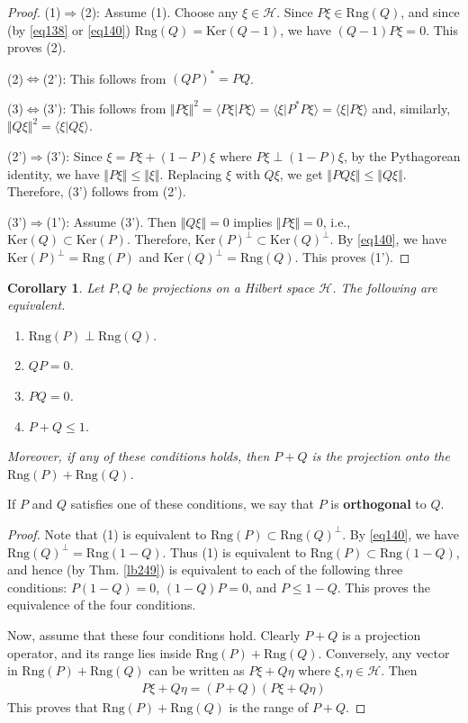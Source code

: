 \documentclass[12pt,b5paper,notitlepage]{article}
\theoremstyle{definition}
\theoremstyle{plain}
\newtheorem{co}[df]{Corollary}
\newcommand{\bk}[1]{\langle {#1}\rangle}
\newcommand{\Ker}{\mathrm{Ker}}
\newcommand{\Rng}{\mathrm{Rng}}
\newcommand{\MH}{\mathcal H}
\numberwithin{equation}{section}
\begin{document}
\begin{proof}
(1)$\Rightarrow$(2): Assume (1). Choose any $\xi\in\MH$. Since $P\xi\in \Rng(Q)$, and since (by \eqref{eq138} or \eqref{eq140}) $\Rng(Q)=\Ker(Q-1)$, we have $(Q-1)P\xi=0$. This proves (2).

(2)$\Leftrightarrow$(2'): This follows from $(QP)^*=PQ$.

(3)$\Leftrightarrow$(3'): This follows from $\Vert P\xi\Vert^2=\bk{P\xi|P\xi}=\bk{\xi|P^*P\xi}=\bk{\xi|P\xi}$ and, similarly, $\Vert Q\xi\Vert^2=\bk{\xi|Q\xi}$.

(2')$\Rightarrow$(3'): Since $\xi=P\xi+(1-P)\xi$ where $P\xi\perp(1-P)\xi$, by the Pythagorean identity, we have $\Vert P\xi\Vert\leq \Vert\xi\Vert$. Replacing $\xi$ with $Q\xi$, we get $\Vert PQ\xi\Vert\leq\Vert Q\xi\Vert$. Therefore, (3') follows from (2'). 


(3')$\Rightarrow$(1'): Assume (3'). Then $\Vert Q\xi\Vert=0$ implies $\Vert P\xi\Vert=0$, i.e.,  $\Ker(Q)\subset\Ker(P)$. Therefore, $\Ker(P)^\perp\subset\Ker(Q)^\perp$. By \eqref{eq140}, we have $\Ker(P)^\perp=\Rng(P)$ and $\Ker(Q)^\perp=\Rng(Q)$. This proves (1').
\end{proof}

\begin{co}\label{lb322}
Let $P,Q$ be projections on a Hilbert space $\MH$. The following are equivalent.
\begin{enumerate}[label=(\arabic*)]
\item $\Rng(P)\perp\Rng(Q)$.
\item $QP=0$.
\item $PQ=0$. 
\item $P+Q\leq 1$.
\end{enumerate}
Moreover, if any of these conditions holds, then $P+Q$ is the projection onto the $\Rng(P)+\Rng(Q)$.
\end{co}

If $P$ and $Q$ satisfies one of these conditions, we say that $P$ is \textbf{orthogonal} to $Q$. 

\begin{proof}
Note that (1) is equivalent to $\Rng(P)\subset\Rng(Q)^\perp$. By \eqref{eq140}, we have $\Rng(Q)^\perp=\Rng(1-Q)$. Thus (1) is equivalent to $\Rng(P)\subset\Rng(1-Q)$, and hence (by Thm. \ref{lb249}) is equivalent to each of the following three conditions: $P(1-Q)=0$,  $(1-Q)P=0$, and $P\leq 1-Q$. This proves the equivalence of the four conditions.

Now, assume that these four conditions hold. Clearly $P+Q$ is a projection operator, and its range lies inside $\Rng(P)+\Rng(Q)$. Conversely, any vector in $\Rng(P)+\Rng(Q)$ can be written as $P\xi+Q\eta$ where $\xi,\eta\in\MH$. Then
\begin{align*}
P\xi+Q\eta=(P+Q)(P\xi+Q\eta)
\end{align*}
This proves that $\Rng(P)+\Rng(Q)$ is the range of $P+Q$.
\end{proof}
\end{document}
